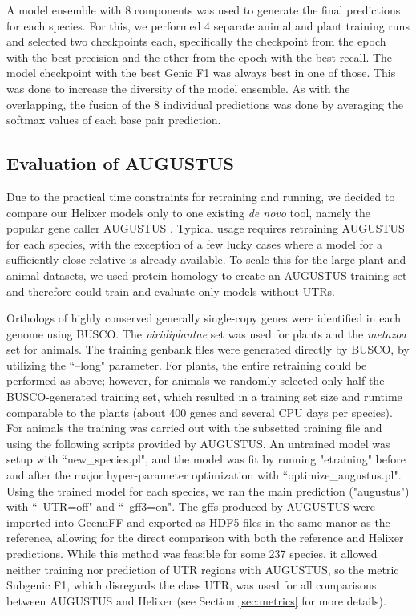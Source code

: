 \documentclass{bioinfo}
\begin{document}
\begin{methods}
A model ensemble with 8 components was used to generate the final predictions for 
each species. For this, we performed 4 separate animal and plant training runs and 
selected two checkpoints each, specifically the checkpoint from the epoch with the best precision and the
other from the epoch with the best recall. The model checkpoint with the best Genic F1 was always best in one of 
those. This was done to increase the diversity of the model ensemble. As with the 
overlapping, the fusion of the 8 individual predictions was done by averaging the 
softmax values of each base pair prediction.

\subsection{Evaluation of AUGUSTUS} 
\label{sec:augustus}
Due to the practical time constraints for retraining and running, we decided to compare our Helixer
models only to one existing {\it de novo} tool, namely the popular gene caller AUGUSTUS \citep{stanke2003gene}.
Typical usage requires retraining AUGUSTUS for each species, with the exception of a
few lucky cases where a model for a sufficiently close relative is already available. To scale this for 
the large plant and animal datasets, we used protein-homology to create an AUGUSTUS training set and
therefore could train and evaluate only models without UTRs. 

Orthologs of highly conserved generally single-copy genes were identified in each genome using
BUSCO. The {\it viridiplantae} set was used for plants and the {\it metazoa} set for animals.
The training genbank files were generated directly by BUSCO, by utilizing the ``--long"  %
parameter. For plants, the entire retraining could be performed as above; however, for animals
we randomly selected only half the BUSCO-generated training set, which resulted in a training set 
size and runtime comparable to the plants (about 400 genes and several CPU days per species). For animals
the training was carried out with the subsetted training file and using the following scripts provided
by AUGUSTUS. An untrained model was setup with ``new\_species.pl", and the model was fit by running
"etraining" before and after the major hyper-parameter optimization with ``optimize\_augustus.pl".
Using the trained model for each species, we ran the main prediction ("augustus") with ``--UTR=off"
and ``--gff3=on". The gffs produced by AUGUSTUS were imported into GeenuFF and exported as HDF5
files in the same manor as the reference, allowing for the direct comparison with both the reference and 
Helixer predictions. While this method was feasible for some 237 species, it allowed neither training
nor prediction of UTR regions with AUGUSTUS, so the metric Subgenic F1, which disregards the class UTR,
was used for all comparisons between AUGUSTUS and Helixer (see Section \ref{sec:metrics} for more details).


\end{methods}
\end{document}
